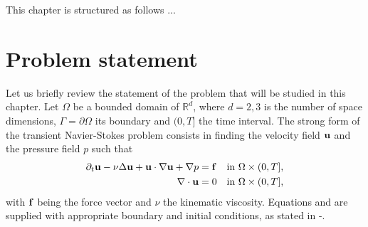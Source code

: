 This chapter is structured as follows ...

%

\section{Problem statement}
\label{sec-C8_prob_statement}

Let us briefly review the statement of the problem that will be studied in this chapter. Let $\Omega$ be a bounded domain of $\mathbb{R}^d$, where $d=2,3$ is the number of space dimensions, $\Gamma=\partial\Omega$ its boundary and $(0,T]$ the time interval. The strong form of the transient Navier-Stokes problem consists in finding the velocity field ${\bf u}$ and the pressure field $p$ such that 
\begin{align}
\label{eq-C8_NS_strong_mome}
\partial_t{\bf u}-\nu\Delta{\bf u}+{\bf u}\cdot\nabla{\bf u}+\nabla p&={\bf f}&\mbox{in $\Omega\times(0,T]$,}\\
\label{eq-C8_NS_strong_inc}
\nabla\cdot{\bf u}&=0&\mbox{in $\Omega\times(0,T]$,}
\end{align}
with ${\bf f}$ being the force vector and $\nu$ the kinematic viscosity. Equations  and  are supplied with appropriate boundary and initial conditions, as stated in -.

